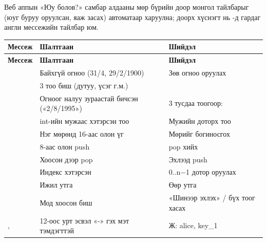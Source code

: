Веб аппын «Юу болов?» самбар алдааны мөр бүрийн доор монгол тайлбарыг (юуг буруу оруулсан, яаж засах) автоматаар харуулна; доорх хүснэгт нь -д гардаг англи мессежийн тайлбар юм.

\begin{longtable}{@{}L{54mm}L{62mm}L{38mm}@{}}
\textbf{Мессеж} & \textbf{Шалтгаан} & \textbf{Шийдэл}\\
\endfirsthead
\textbf{Мессеж} & \textbf{Шалтгаан} & \textbf{Шийдэл}\\
\endhead
{} & Байхгүй огноо (31/4, 29/2/1900) & Зөв огноо оруулах\\
\newline{} & 3 тоо биш (дутуу, үсэг г.м.) & \\
\newline{}\newline{} & Огноог налуу зураастай бичсэн («2/8/1995») & 3 тусдаа тоогоор: \\
\newline{} & int-ийн мужаас хэтэрсэн тоо & Мужийн доторх тоо\\
\newline{} & Нэг мөрөнд 16-аас олон үг & Мөрийг богиносгох\\
\newline{} & 8-аас олон push & pop хийх\\
\newline{} & Хоосон дээр pop & Эхлээд push\\
\newline{} & Индекс хэтэрсэн & 0..n$-$1 дотор оруулах\\
 & Ижил утга & Өөр утга\\
\newline{} & Мод хоосон биш & «Шинээр эхлэх» / бүх тоог хасах\\
\newline{},  & 12-оос урт эсвэл «-» гэх мэт тэмдэгттэй & Ж: alice, key\_1\\

\end{longtable}
